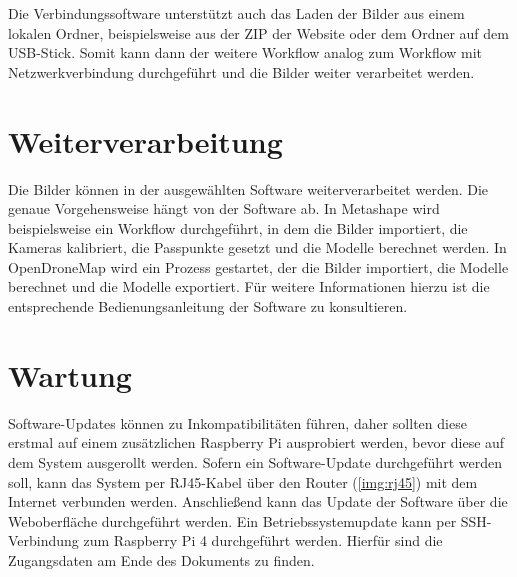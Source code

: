 \documentclass[./00PhotoBox.tex]{subfiles}
\begin{document}
Die Verbindungssoftware unterstützt auch das Laden der Bilder aus einem lokalen Ordner, beispielsweise aus der ZIP der Website oder dem Ordner auf dem USB-Stick. Somit kann dann der weitere Workflow analog zum Workflow mit Netzwerkverbindung durchgeführt und die Bilder weiter verarbeitet werden.

\section{Weiterverarbeitung}
Die Bilder können in der ausgewählten Software weiterverarbeitet werden. Die genaue Vorgehensweise hängt von der Software ab. In Metashape wird beispielsweise ein Workflow durchgeführt, in dem die Bilder importiert, die Kameras kalibriert, die Passpunkte gesetzt und die Modelle berechnet werden. In OpenDroneMap wird ein Prozess gestartet, der die Bilder importiert, die Modelle berechnet und die Modelle exportiert. Für weitere Informationen hierzu ist die entsprechende Bedienungsanleitung der Software zu konsultieren.

\section{Wartung}
Software-Updates können zu Inkompatibilitäten führen, daher sollten diese erstmal auf einem zusätzlichen Raspberry Pi ausprobiert werden, bevor diese auf dem System ausgerollt werden. Sofern ein Software-Update durchgeführt werden soll, kann das System per RJ45-Kabel über den Router (\autoref{img:rj45}) mit dem Internet verbunden werden. Anschließend kann das Update der Software über die Weboberfläche durchgeführt werden. Ein Betriebssystemupdate kann per SSH-Verbindung zum Raspberry Pi 4 durchgeführt werden. Hierfür sind die Zugangsdaten am Ende des Dokuments zu finden.
\end{document}
